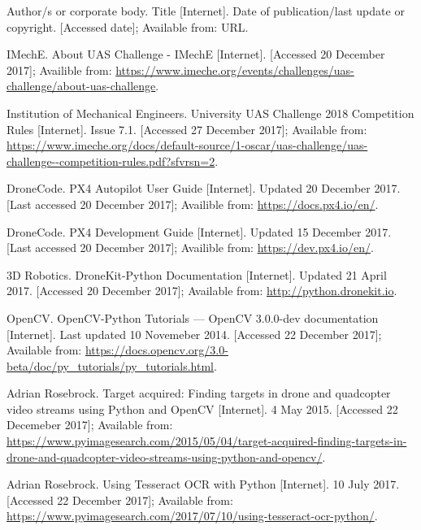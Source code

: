 \documentclass[10pt]{article}
\begin{document}
\newpage
\begin{thebibliography}{11}

    Author/s or corporate body. Title [Internet]. Date of publication/last update or copyright. [Accessed date]; Available from: URL.

    IMechE. About UAS Challenge - IMechE [Internet]. [Accessed 20 December 2017]; Availible from: \url{https://www.imeche.org/events/challenges/uas-challenge/about-uas-challenge}.

    Institution of Mechanical Engineers. University UAS Challenge 2018 Competition Rules [Internet]. Issue 7.1. [Accessed 27 December 2017]; Available from: \url{https://www.imeche.org/docs/default-source/1-oscar/uas-challenge/uas-challenge--competition-rules.pdf?sfvrsn=2}.

    DroneCode. PX4 Autopilot User Guide [Internet]. Updated 20 December 2017. [Last accessed 20 December 2017]; Availible from: \url{https://docs.px4.io/en/}.

    DroneCode. PX4 Development Guide [Internet]. Updated 15 December 2017. [Last accessed 20 December 2017]; Availible from: \url{https://dev.px4.io/en/}.

    3D Robotics. DroneKit-Python Documentation [Internet]. Updated 21 April 2017. [Accessed 20 December 2017]; Available from: \url{http://python.dronekit.io}.

    OpenCV. OpenCV-Python Tutorials — OpenCV 3.0.0-dev documentation [Internet]. Last updated 10 Novemeber 2014. [Accessed 22 December 2017]; Available from: \url{https://docs.opencv.org/3.0-beta/doc/py_tutorials/py_tutorials.html}.

    Adrian Rosebrock. Target acquired: Finding targets in drone and quadcopter video streams using Python and OpenCV [Internet]. 4 May 2015. [Accessed 22 Decemeber 2017]; Available from: \url{https://www.pyimagesearch.com/2015/05/04/target-acquired-finding-targets-in-drone-and-quadcopter-video-streams-using-python-and-opencv/}.

    Adrian Rosebrock. Using Tesseract OCR with Python [Internet]. 10 July 2017. [Accessed 22 December 2017]; Available from: \url{https://www.pyimagesearch.com/2017/07/10/using-tesseract-ocr-python/}.


\end{thebibliography}
\end{document}

